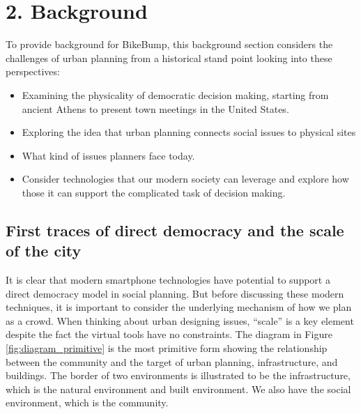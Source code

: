 \newcommand{\repeatcaption}[2]{%
  \renewcommand{\thefigure}{\ref{#1}}%
  \caption{#2 (repeated from page \pageref{#1})}%
}


\chapter{2. Background}

To provide background for BikeBump, this background section considers the challenges of urban planning from a historical stand point looking into these perspectives:
\begin{itemize}
  \item Examining the physicality of democratic decision making, starting
    from ancient Athens to present town meetings in the United States.
  \item Exploring the idea that urban planning connects social issues to physical sites
  \item What kind of issues planners face today. 
  \item Consider technologies that our modern society can leverage and
    explore how those it can support the complicated task of decision
    making. 
\end{itemize}

\section{First traces of direct democracy and the scale of the city}
It is clear that modern smartphone technologies have potential to support a
direct democracy model in social planning. But before discussing these
modern techniques, it is important to consider the underlying mechanism of
how we plan as a crowd.
When thinking about urban designing issues, ``scale'' is a key element
despite the fact the virtual tools have no constraints.
The diagram in Figure \ref{fig:diagram_primitive} is the most primitive
form showing the relationship between the community and the target of urban
planning, infrastructure, and buildings. The border of two environments is
illustrated to be the infrastructure, which is the natural environment and
built environment. We also have the social environment, which is the
community.

